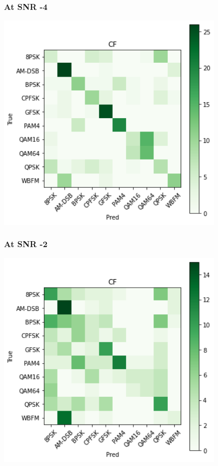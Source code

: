 \documentclass[12pt,a4paper]{article}
\begin{document}
\subsubsection{At SNR -4}
\begin{center}
\includegraphics[width=320pt]{imgs/snrs/snr7.png}
\end{center}
\subsubsection{At SNR -2}
\begin{center}
\includegraphics[width=320pt]{imgs/snrs/snr5.png}
\end{center}
\end{document}
